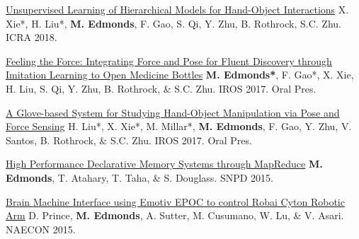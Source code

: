 \begin{cvpublications}
\item \cvpublication
{\href{http://www.mjedmonds.com/papers/ICRA18_Unsupervised_learning_hierarchical_hoi.pdf}{Unsupervised Learning of Hierarchical Models for Hand-Object Interactions}} %
{X. Xie*, H. Liu*, \textbf{M. Edmonds}, F. Gao, S. Qi, Y. Zhu, B. Rothrock, S.C. Zhu.} %
{ICRA 2018.} %
{} %

\item \cvpublication
{\href{http://www.mjedmonds.com/papers/IROS17_OpenBottle_final.pdf}{Feeling the Force: Integrating Force and Pose for Fluent Discovery through Imitation Learning to Open Medicine Bottles}} %
{\textbf{M. Edmonds*}, F. Gao*, X. Xie, H. Liu, S. Qi, Y. Zhu, B. Rothrock, \& S.C. Zhu.} %
{IROS 2017.} %
{Oral Pres.} %

\item \cvpublication
{\href{http://www.mjedmonds.com/papers/IROS17_GloveHardware_final.pdf}{A Glove-based System for Studying Hand-Object Manipulation via Pose and Force Sensing}} %
{H. Liu*, X. Xie*, M. Millar*, \textbf{M. Edmonds}, F. Gao, Y. Zhu, V. Santos, B. Rothrock, \& S.C. Zhu.} %
{IROS 2017.} %
{Oral Pres.} %

\item \cvpublication
{\href{http://www.mjedmonds.com/papers/SNPD_2015_HighPerformanceDM_final.pdf}{High Performance Declarative Memory Systems through MapReduce}} %
{\textbf{M. Edmonds}, T. Atahary, T. Taha, \& S. Douglass.} %
{SNPD 2015.} %
{} %


\item \cvpublication
{\href{http://www.mjedmonds.com/papers/bmi-using-emotiv.pdf}{Brain Machine Interface using Emotiv EPOC to control Robai Cyton Robotic Arm}} %
{D. Prince, \textbf{M. Edmonds}, A. Sutter, M. Cusumano, W. Lu, \& V. Asari.} %
{NAECON 2015.} %
{} %

\cvequalcontribution

\end{cvpublications}